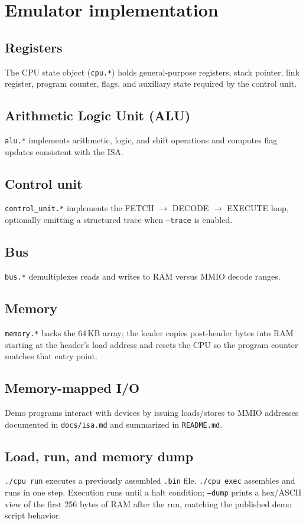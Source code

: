 \documentclass[12pt]{article}
\begin{document}
\section{Emulator implementation}
\subsection{Registers}
The CPU state object (\texttt{cpu.*}) holds general-purpose registers, stack pointer, link register, program counter, flags, and auxiliary state required by the control unit.

\subsection{Arithmetic Logic Unit (ALU)}
\texttt{alu.*} implements arithmetic, logic, and shift operations and computes flag updates consistent with the ISA.

\subsection{Control unit}
\texttt{control\_unit.*} implements the FETCH $\rightarrow$ DECODE $\rightarrow$ EXECUTE loop, optionally emitting a structured trace when \texttt{--trace} is enabled.

\subsection{Bus}
\texttt{bus.*} demultiplexes reads and writes to RAM versus MMIO decode ranges.

\subsection{Memory}
\texttt{memory.*} backs the 64\,KB array; the loader copies post-header bytes into RAM starting at the header's load address and resets the CPU so the program counter matches that entry point.

\subsection{Memory-mapped I/O}
Demo programs interact with devices by issuing loads/stores to MMIO addresses documented in \texttt{docs/isa.md} and summarized in \texttt{README.md}.

\subsection{Load, run, and memory dump}
\texttt{./cpu run} executes a previously assembled \texttt{.bin} file. \texttt{./cpu exec} assembles and runs in one step. Execution runs until a halt condition; \texttt{--dump} prints a hex/ASCII view of the first 256 bytes of RAM after the run, matching the published demo script behavior.
\end{document}
